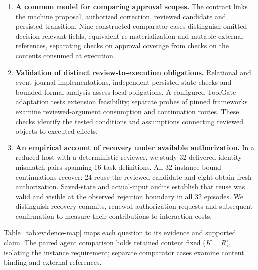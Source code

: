 \documentclass[pdflatex,sn-basic]{sn-jnl}
\begin{document}
\begin{enumerate}
\item \textbf{A common model for comparing approval scopes.} The contract links the machine proposal, authorized correction, reviewed candidate and persisted transition. Nine constructed comparator cases distinguish omitted decision-relevant fields, equivalent re-materialization and mutable external references, separating checks on approval coverage from checks on the contents consumed at execution.
\item \textbf{Validation of distinct review-to-execution obligations.} Relational and event-journal implementations, independent persisted-state checks and bounded formal analysis assess local obligations. A configured ToolGate adaptation tests extension feasibility; separate probes of pinned frameworks examine reviewed-argument consumption and continuation routes. These checks identify the tested conditions and assumptions connecting reviewed objects to executed effects.
\item \textbf{An empirical account of recovery under available authorization.} In a reduced host with a deterministic reviewer, we study 32 delivered identity-mismatch pairs spanning 16 task definitions. All 32 instance-bound continuations recover: 24 reuse the reviewed candidate and eight obtain fresh authorization. Saved-state and actual-input audits establish that reuse was valid and visible at the observed rejection boundary in all 32 episodes. We distinguish recovery commits, renewed authorization requests and subsequent confirmation to measure their contributions to interaction costs.
\end{enumerate}

Table~\ref{tab:evidence-map} maps each question to its evidence and supported claim. The paired agent comparison holds retained content fixed ($K=R$), isolating the instance requirement; separate comparator cases examine content binding and external references.
\end{document}
